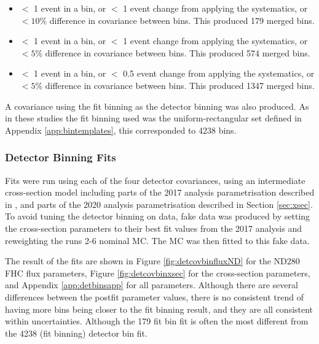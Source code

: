 \begin{itemize}

\item $<$ 1 event in a bin, or $<$ 1 event change from applying the systematics, or $< 10\%$ difference in covariance between bins. This produced 179 merged bins.

\item $<$ 1 event in a bin, or $<$ 1 event change from applying the systematics, or $< 5\%$ difference in covariance between bins. This produced 574 merged bins.

\item $<$ 1 event in a bin, or $<$ 0.5 event change from applying the systematics, or $< 5\%$ difference in covariance between bins. This produced 1347 merged bins.

\end{itemize}

A covariance using the fit binning as the detector binning was also produced. As in these studies the fit binning used was the uniform-rectangular set defined in Appendix \ref{app:bintemplates}, this corresponded to 4238 bins.

\subsubsection{Detector Binning Fits}\label{sec:detbinfits}

Fits were run using each of the four detector covariances, using an intermediate cross-section model including parts of the 2017 analysis parametrisation described in \cite{tn315}, and parts of the 2020 analysis parametrisation described in Section \ref{sec:xsec}. To avoid tuning the detector binning on data, fake data was produced by setting the cross-section parameters to their best fit values from the 2017 analysis and reweighting the runs 2-6 nominal MC. The MC was then fitted to this fake data.

The result of the fits are shown in Figure \ref{fig:detcovbinfluxND} for the ND280 FHC flux parameters, Figure \ref{fig:detcovbinxsec} for the cross-section parameters, and Appendix \ref{app:detbinsapp} for all parameters. Although there are several differences between the postfit parameter values, there is no consistent trend of having more bins being closer to the fit binning result, and they are all consistent within uncertainties. Although the 179 fit bin fit is often the most different from the 4238 (fit binning) detector bin fit.

